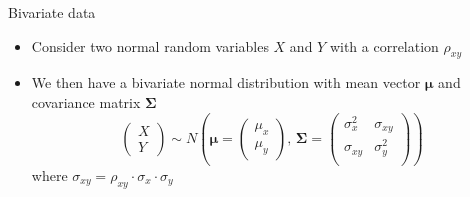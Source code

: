 \documentclass[aspectratio=169]{beamer}
\newcommand{\gmat}[1]{\boldsymbol{#1}}
\begin{document}
\begin{frame}{Bivariate data}
  \begin{itemize}
    \item Consider two normal random variables $X$ and $Y$ with a correlation
      $\rho_{xy}$
    \item We then have a bivariate normal distribution with mean vector
      $\boldsymbol \mu$ and covariance matrix $\boldsymbol \Sigma$
  \begin{equation*}
  \begin{pmatrix} X\\ Y \end{pmatrix}  \sim
    N \left(\boldsymbol\mu = \begin{pmatrix} \mu_x\\ \mu_y \end{pmatrix}, \,
      \gmat{\Sigma} =
      \begin{pmatrix}
        \sigma^2_{x} & \sigma_{xy} \\
        \sigma_{xy} & \sigma^2_{y} \\
      \end{pmatrix} \right)
\end{equation*}
      where $\sigma_{xy} = \rho_{xy}\cdot\sigma_{x}\cdot\sigma_{y}$
  \end{itemize}
\end{frame}
\end{document}

